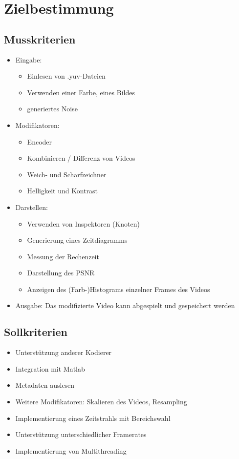 \section{Zielbestimmung}

\subsection{Musskriterien}

\begin{itemize}
	\item Eingabe: 
	\begin{itemize}
		\item Einlesen von .yuv-Dateien
		\item Verwenden einer Farbe, eines Bildes
		\item generiertes Noise
	\end{itemize}
	\item Modifikatoren:
	\begin{itemize}
		\item Encoder
		\item Kombinieren / Differenz von Videos
		\item Weich- und Scharfzeichner
		\item Helligkeit und Kontrast
	\end{itemize}
	\item Darstellen:
	\begin{itemize}
		\item Verwenden von Inspektoren (Knoten)
		\item Generierung eines Zeitdiagramms
		\item Messung der Rechenzeit
		\item Darstellung des PSNR
		\item Anzeigen des (Farb-)Histograms einzelner Frames des Videos
	\end{itemize}
	\item Ausgabe: Das modifizierte Video kann abgespielt und gespeichert werden
\end{itemize}

\subsection{Sollkriterien}

\begin{itemize}
	\item Unterstützung anderer Kodierer
	\item Integration mit Matlab
	\item Metadaten auslesen
	\item Weitere Modifikatoren: Skalieren des Videos, Resampling
	\item Implementierung eines Zeitstrahls mit Bereichswahl
	\item Unterstützung unterschiedlicher Framerates 
	\item Implementierung von Multithreading
\end{itemize}

